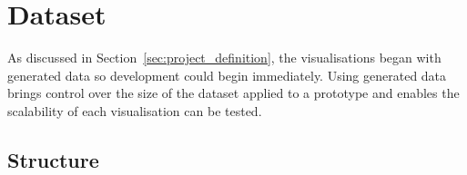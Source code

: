 \section{Dataset} {
\label{sec:dataset}

	As discussed in Section~\ref{sec:project_definition}, the visualisations began with generated data so development could begin immediately. Using generated data brings control over the size of the dataset applied to a prototype and enables the scalability of each visualisation can be tested. 




	\subsection{Structure} {
	\label{sec:dataset_structure}



	}

}

